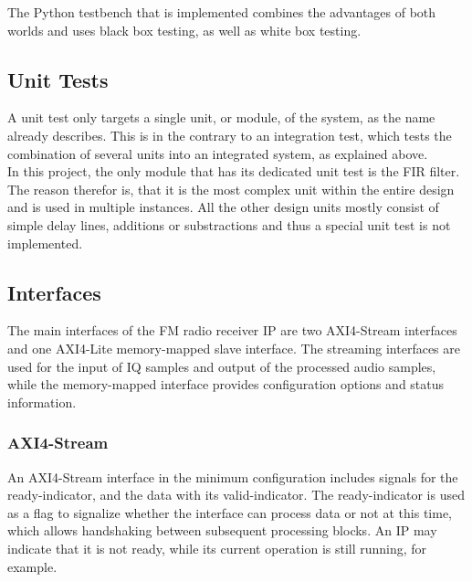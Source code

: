 The Python testbench that is implemented combines the advantages of both worlds and uses black box testing, as well as white box testing.

\subsection{Unit Tests}

A unit test only targets a single unit, or module, of the system, as the name already describes.
This is in the contrary to an integration test, which tests the combination of several units into an integrated system, as explained above.\\

In this project, the only module that has its dedicated unit test is the FIR filter.
The reason therefor is, that it is the most complex unit within the entire design and is used in multiple instances.
All the other design units mostly consist of simple delay lines, additions or substractions and thus a special unit test is not implemented.

\subsection{Interfaces}
\label{sec:impl:vhdl:interfaces}

The main interfaces of the FM radio receiver IP are two AXI4-Stream interfaces and one AXI4-Lite memory-mapped slave interface.
The streaming interfaces are used for the input of IQ samples and output of the processed audio samples, while the memory-mapped interface provides configuration options and status information.

\subsubsection{AXI4-Stream}

An AXI4-Stream interface in the minimum configuration includes signals for the ready-indicator, and the data with its valid-indicator.
The ready-indicator is used as a flag to signalize whether the interface can process data or not at this time, which allows handshaking between subsequent processing blocks.
An IP may indicate that it is not ready, while its current operation is still running, for example.\\

